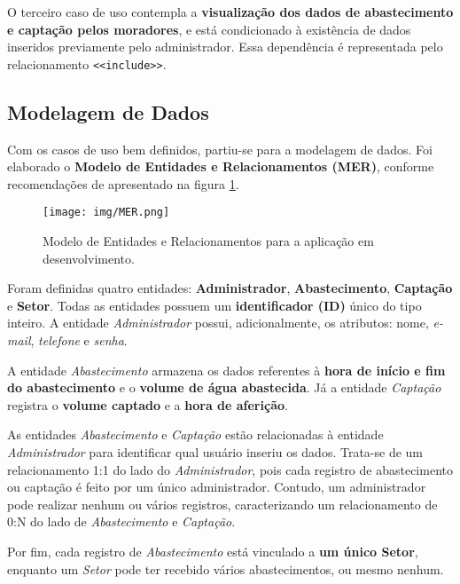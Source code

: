 O terceiro caso de uso contempla a \textbf{visualização dos dados de abastecimento e captação pelos moradores}, e está condicionado à existência de dados inseridos previamente pelo administrador. Essa dependência é representada pelo relacionamento \verb|<<include>>|. \cite{fowler}

\subsection{Modelagem de Dados}\label{subsec:Modelagem}

Com os casos de uso bem definidos, partiu-se para a modelagem de dados. Foi elaborado o \textbf{Modelo de Entidades e Relacionamentos (MER)}, conforme recomendações de  apresentado na figura \ref{fig:MER}.



\begin{figure}[htbp!]
    \centering
    \suppressfloats[t]
    \texttt{[image: img/MER.png]}
    \caption{Modelo de Entidades e Relacionamentos para a aplicação em desenvolvimento.}
    \label{fig:MER}
\end{figure}

Foram definidas quatro entidades: \textbf{Administrador}, \textbf{Abastecimento}, \textbf{Captação} e \textbf{Setor}. Todas as entidades possuem um \textbf{identificador (ID)} único do tipo inteiro. A entidade \textit{Administrador} possui, adicionalmente, os atributos: nome, \textit{e-mail}, \textit{telefone} e \textit{senha}.

A entidade \textit{Abastecimento} armazena os dados referentes à \textbf{hora de início e fim do abastecimento} e o \textbf{volume de água abastecida}. Já a entidade \textit{Captação} registra o \textbf{volume captado} e a \textbf{hora de aferição}.

As entidades \textit{Abastecimento} e \textit{Captação} estão relacionadas à entidade \textit{Administrador} para identificar qual usuário inseriu os dados. Trata-se de um relacionamento 1:1 do lado do \textit{Administrador}, pois cada registro de abastecimento ou captação é feito por um único administrador. Contudo, um administrador pode realizar nenhum ou vários registros, caracterizando um relacionamento de 0:N do lado de \textit{Abastecimento} e \textit{Captação}. \cite{heuser}

Por fim, cada registro de \textit{Abastecimento} está vinculado a \textbf{um único Setor}, enquanto um \textit{Setor} pode ter recebido vários abastecimentos, ou mesmo nenhum.

